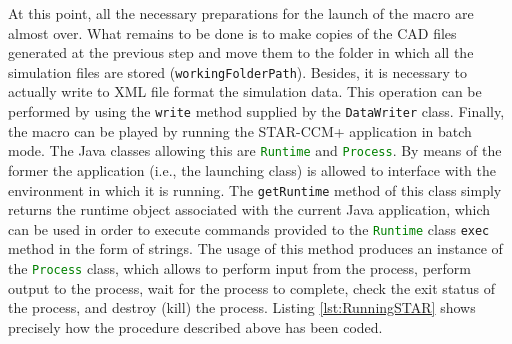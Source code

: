 \bigskip
\noindent
At this point, all the necessary preparations for the launch of the macro are almost over. What remains to be done is to make copies of the \gls{CAD} files generated at the previous step and move them to the folder in which all the simulation files are stored (\lstinline[language=Java]!workingFolderPath!). Besides, it is necessary to actually write to XML file format the simulation data. This operation can be performed by using the \lstinline[language=Java]!write! method supplied by the \lstinline[language=Java]!DataWriter! class. Finally, the macro can be played by running the STAR-CCM+ application in batch mode. The Java classes allowing this are \lstinline[language=Java]!Runtime! and \lstinline[language=Java]!Process!. By means of the former the application (i.e., the launching class) is allowed to interface with the environment in which it is running. The \lstinline[language=Java]!getRuntime! method of this class simply returns the runtime object associated with the current Java application, which can be used in order to execute commands provided to the \lstinline[language=Java]!Runtime! class \lstinline[language=Java]!exec! method in the form of strings. The usage of this method produces an instance of the \lstinline[language=Java]!Process! class, which allows to perform input from the process, perform output to the process, wait for the process to complete, check the exit status of the process, and destroy (kill) the process. Listing \ref{lst:RunningSTAR} shows precisely how the procedure described above has been coded.
%
\bigskip
